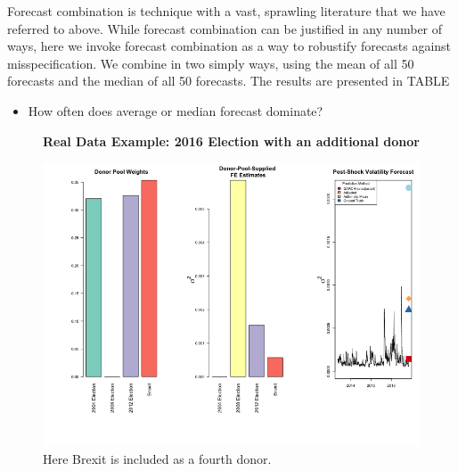 \documentclass[11pt,3p,review,authoryear]{elsarticle}
\theoremstyle{definition}
\begin{document}
Forecast combination is technique with a vast, sprawling literature that we have referred to above.  While forecast combination can be justified in any number of ways, here we invoke forecast combination as a way to robustify forecasts against misspecification.  We combine in two simply ways, using the mean of all 50 forecasts and the median of all 50 forecasts.  The results are presented in TABLE
\begin{itemize}
  \item How often does average or median forecast dominate?
\end{itemize}

\begin{figure}[H]
  \begin{center}
    \textbf{Real Data Example: 2016 Election with an additional donor}\par\medskip
    \includegraphics[scale=.6]{real_data_output_plots/FriMay311830182024_IYG_None_None.png}
    \caption{Here Brexit is included as a fourth donor.}
    \label{fig:SVF_2016_with_Brexit}
    \end{center}
  \end{figure}

\clearpage


\end{document}
